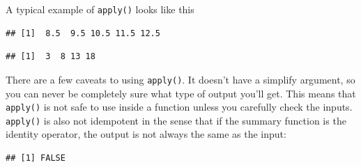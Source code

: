 A typical example of \texttt{apply()} looks like this

\begin{Shaded}
\begin{Highlighting}[]
\StringTok{ }\NormalTok{(}\OperatorTok{:}\NormalTok{, } \NormalTok{)}
\end{Highlighting}
\end{Shaded}

\begin{verbatim}
## [1]  8.5  9.5 10.5 11.5 12.5
\end{verbatim}

\begin{Shaded}
\begin{Highlighting}[]
\end{Highlighting}
\end{Shaded}

\begin{verbatim}
## [1]  3  8 13 18
\end{verbatim}

There are a few caveats to using \texttt{apply()}. It doesn't have a
simplify argument, so you can never be completely sure what type of
output you'll get. This means that \texttt{apply()} is not safe to use
inside a function unless you carefully check the inputs.
\texttt{apply()} is also not idempotent in the sense that if the summary
function is the identity operator, the output is not always the same as
the input:

\begin{Shaded}
\begin{Highlighting}[]
\StringTok{ }
\end{Highlighting}
\end{Shaded}

\begin{verbatim}
## [1] FALSE
\end{verbatim}

\begin{Shaded}
\begin{Highlighting}[]
\end{Highlighting}
\end{Shaded}

